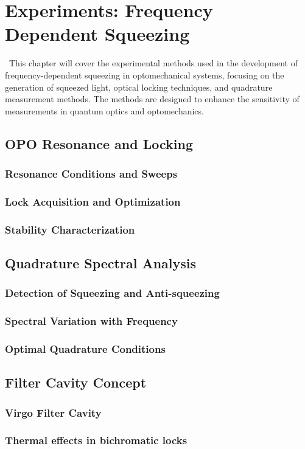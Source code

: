 

\chapter{Experiments: Frequency Dependent Squeezing}%
\label{chap:FDS}
\etocsettocstyle{\section*{\contentsname}}{}
\localtableofcontents\
This chapter will cover the experimental methods used in the development of frequency-dependent squeezing in optomechanical systems, focusing on the generation of squeezed light, optical locking techniques, and quadrature measurement methods. The methods are designed to enhance the sensitivity of measurements in quantum optics and optomechanics.
\section{OPO Resonance and Locking}
\subsection{Resonance Conditions and Sweeps}
\subsection{Lock Acquisition and Optimization}
\subsection{Stability Characterization}
\section{Quadrature Spectral Analysis}
\subsection{Detection of Squeezing and Anti-squeezing}
\subsection{Spectral Variation with Frequency}
\subsection{Optimal Quadrature Conditions}
\section{Filter Cavity Concept}
\subsection{Virgo Filter Cavity }
\subsection{Thermal effects in bichromatic locks}
